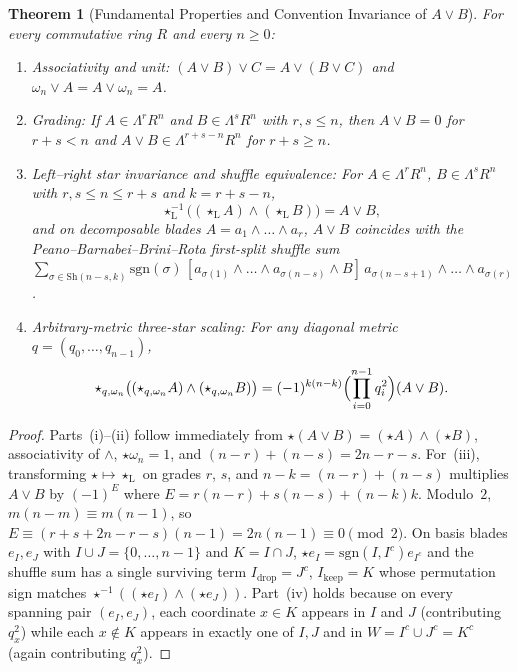 \documentclass[11pt]{article}
\newtheorem{theorem}{Theorem}[section]
\theoremstyle{definition}
\begin{document}
\begin{theorem}[Fundamental Properties and Convention Invariance of $A \vee B$]\label{thm:vee-props}
For every commutative ring $R$ and every $n \ge 0$:
\begin{enumerate}
\item \emph{Associativity and unit:} $(A \vee B) \vee C = A \vee (B \vee C)$ and $\omega_n \vee A = A \vee \omega_n = A$.
\item \emph{Grading:} If $A \in \Lambda^r R^n$ and $B \in \Lambda^s R^n$ with $r, s \le n$, then $A \vee B = 0$ for $r + s < n$ and $A \vee B \in \Lambda^{r+s-n} R^n$ for $r + s \ge n$.
\item \emph{Left--right star invariance and shuffle equivalence:} For $A \in \Lambda^r R^n$, $B \in \Lambda^s R^n$ with $r, s \le n \le r + s$ and $k = r + s - n$,
\[
\star_{\mathrm{L}}^{-1}\bigl((\star_{\mathrm{L}} A) \wedge (\star_{\mathrm{L}} B)\bigr) = A \vee B,
\]
and on decomposable blades $A = a_1 \wedge \dots \wedge a_r$, $A \vee B$ coincides with the Peano--Barnabei--Brini--Rota first-split shuffle sum $\sum_{\sigma \in \mathrm{Sh}(n-s,k)} \mathrm{sgn}(\sigma)\,[a_{\sigma(1)} \wedge \dots \wedge a_{\sigma(n-s)} \wedge B]\,a_{\sigma(n-s+1)} \wedge \dots \wedge a_{\sigma(r)}$.
\item \emph{Arbitrary-metric three-star scaling:} For any diagonal metric $q = (q_0, \dots, q_{n-1})$,
\[
\star_{q,\omega_n}\bigl((\star_{q,\omega_n} A) \wedge (\star_{q,\omega_n} B)\bigr)
= (-1)^{k(n-k)} \Bigl(\prod_{i=0}^{n-1} q_i^2\Bigr) (A \vee B).
\]
\end{enumerate}
\end{theorem}
\begin{proof}
Parts~(i)--(ii) follow immediately from $\star(A \vee B) = (\star A) \wedge (\star B)$, associativity of $\wedge$, $\star\omega_n = 1$, and $(n-r) + (n-s) = 2n - r - s$. For~(iii), transforming $\star \mapsto \star_{\mathrm{L}}$ on grades $r$, $s$, and $n - k = (n-r)+(n-s)$ multiplies $A \vee B$ by $(-1)^E$ where $E = r(n-r) + s(n-s) + (n-k)k$. Modulo~$2$, $m(n-m) \equiv m(n-1)$, so $E \equiv (r + s + 2n - r - s)(n - 1) = 2n(n - 1) \equiv 0 \pmod{2}$. On basis blades $e_I, e_J$ with $I \cup J = \{0, \dots, n-1\}$ and $K = I \cap J$, $\star e_I = \mathrm{sgn}(I, I^c) e_{I^c}$ and the shuffle sum has a single surviving term $I_{\mathrm{drop}} = J^c$, $I_{\mathrm{keep}} = K$ whose permutation sign matches $\star^{-1}((\star e_I) \wedge (\star e_J))$. Part~(iv) holds because on every spanning pair $(e_I, e_J)$, each coordinate $x \in K$ appears in $I$ and $J$ (contributing $q_x^2$) while each $x \notin K$ appears in exactly one of $I, J$ and in $W = I^c \cup J^c = K^c$ (again contributing $q_x^2$).
\end{proof}
\end{document}
